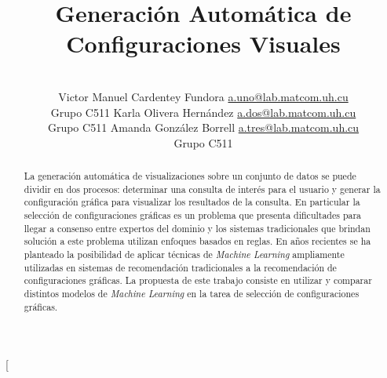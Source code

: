 \documentclass[a4paper,10pt,twocolumn]{article}
\title{Generación Automática de Configuraciones Visuales}
\author{\\
\name Victor Manuel Cardentey Fundora \email \href{mailto:a.uno@lab.matcom.uh.cu}{a.uno@lab.matcom.uh.cu}
	\\ \addr Grupo C511 \AND
\name Karla Olivera Hernández \email \href{mailto:a.dos@lab.matcom.uh.cu}{a.dos@lab.matcom.uh.cu}
  \\ \addr Grupo C511 \AND
\name Amanda González Borrell \email \href{mailto:}{a.tres@lab.matcom.uh.cu}
  \\ \addr Grupo C511
  }
\begin{document}
\twocolumn[

\maketitle


\begin{abstract}

	La generación automática de visualizaciones sobre un conjunto de
    datos se puede dividir en dos procesos: determinar una consulta de interés
    para el usuario y generar la configuración gráfica para visualizar los resultados de la
    consulta. En particular la selección de configuraciones gráficas es un problema que
    presenta dificultades para llegar a consenso entre expertos del dominio y los sistemas
    tradicionales que brindan solución a este problema utilizan enfoques basados en reglas.
    En años recientes se ha planteado la posibilidad de aplicar técnicas de \textit{Machine Learning}
    ampliamente utilizadas en sistemas de recomendación tradicionales a la recomendación de configuraciones
    gráficas. La propuesta de este trabajo consiste en utilizar y comparar distintos modelos
    de \textit{Machine Learning} en la tarea de selección de configuraciones gráficas.

\end{abstract}



\end{document}
